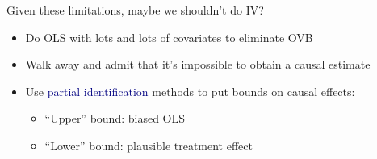 \documentclass[aspectratio=169]{beamer}
\begin{document}
\begin{frame}

Given these limitations, maybe we shouldn't do IV?

\bigskip


\bigskip

\begin{itemize}
\itemsep1.5em
\item<3-> Do OLS with lots and lots of covariates to eliminate OVB

\item<4-> Walk away and admit that it's impossible to obtain a causal estimate

\item<5-> Use \textcolor{navy}{partial identification} methods to put bounds on causal effects:
\bigskip\par
    \begin{itemize}
    \itemsep1.5em
    \item<6-> ``Upper'' bound: biased OLS
    \item<7-> ``Lower'' bound: plausible treatment effect
    \end{itemize}
\end{itemize}

\end{frame}
\end{document}
